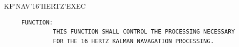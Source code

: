\begin{frame}
KF'NAV'16'HERTZ'EXEC
\begin{verbatim}
     FUNCTION:
              THIS FUNCTION SHALL CONTROL THE PROCESSING NECESSARY
              FOR THE 16 HERTZ KALMAN NAVAGATION PROCESSING.

\end{verbatim}
\end{frame}
